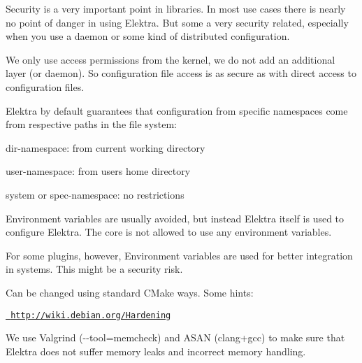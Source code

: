 Security is a very important point in libraries. In most use cases there is nearly no point of danger in using Elektra. But some a very security related, especially when you use a daemon or some kind of distributed configuration.

We only use access permissions from the kernel, we do not add an additional layer (or daemon). So configuration file access is as secure as with direct access to configuration files.

Elektra by default guarantees that configuration from specific namespaces come from respective paths in the file system\+:


\begin{DoxyItemize}
\item {\ttfamily dir}-\/namespace\+: from current working directory
\item {\ttfamily user}-\/namespace\+: from users home directory
\item {\ttfamily system} or {\ttfamily spec}-\/namespace\+: no restrictions
\end{DoxyItemize}

Environment variables are usually avoided, but instead Elektra itself is used to configure Elektra. The core is not allowed to use any environment variables.

For some plugins, however, Environment variables are used for better integration in systems. This might be a security risk.

Can be changed using standard C\+Make ways. Some hints\+:

\href{http://wiki.debian.org/Hardening}{\texttt{ http\+://wiki.\+debian.\+org/\+Hardening}}

We use Valgrind ({\ttfamily -\/-\/tool=memcheck}) and A\+S\+AN (clang+gcc) to make sure that Elektra does not suffer memory leaks and incorrect memory handling. 